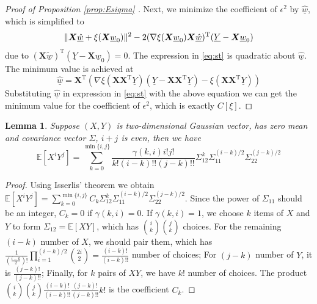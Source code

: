 \documentclass[conference]{IEEEtran}
\newtheorem{lemma}{Lemma}
\DeclarePairedDelimiter\norm{\lVert}{\rVert}
\def\E{\mathbb{E}}
\def\T{\mathrm{T}}
\newcommand{\ide}[2]{ \gamma(#1,#2) }
\begin{document}
\begin{proof}[Proof of Proposition \ref{prop:Esigma} ]
Next, we minimize the coefficient of $\epsilon^2$ by $\underline{\hat{w}}$, which is simplified to 
\begin{equation}\label{eq:st}
\norm{\bm{X}\underline{\hat{w}} + \xi(\bm{X} \underline{w}_0)}^2-
2 (
\nabla \xi(\bm{X} \underline{w}_0)\bm{X}\underline{\hat{w}})^\T(\underline{Y}-\bm{X} \underline{w}_0)
\end{equation}
due to $(\bm{X}\underline{\tilde{w}})^\T (\underline{Y}-\bm{X}\underline{w}_0) = 0 $.
The expression in \eqref{eq:st} is quadratic about $\underline{\hat{w}}$. The minimum value is achieved  at
$$
\underline{\hat{w}} =  \bm{X}^\T(\nabla\xi(\bm{X}\bm{X}^\T \underline{Y})
(\underline{Y}-\bm{X}\bm{X}^\T \underline{Y}) - \xi(\bm{X}\bm{X}^\T \underline{Y}))
$$
Substituting $\underline{\hat{w}}$ in expression in \eqref{eq:st} with the above equation we can get the minimum value for the coefficient of $\epsilon^2$, which is exactly $C[\xi]$.
\end{proof}
\begin{lemma}\label{lemma:Isserlis2}
     Suppose $(X,Y)$ is two-dimensional Gaussian vector,
     has zero mean and covariance vector $\Sigma$, $ i + j $ is even, then we have
\begin{equation*}
    \E[X^i Y^j] =
    \sum_{k=0}^{\min\{i,j\}}
    \frac{\ide{k}{i} i! j!}{k! (i-k)!!(j-k)!!}
    \Sigma_{12}^k \Sigma_{11}^{(i-k)/2}\Sigma_{22}^{(j-k)/2}
\end{equation*}
\end{lemma}
\begin{proof}
Using Isserlis' theorem \cite{isserlis1918formula} we obtain
$  \E[X^i Y^j] = \sum_{k=0}^{\min\{i,j\}} C_k \Sigma_{12}^k \Sigma_{11}^{(i-k)/2}\Sigma_{22}^{(j-k)/2}$. Since the power of $\Sigma_{11}$ should be an integer, $C_k = 0$ if $\ide{k}{i} = 0$. If $\ide{k}{i} = 1$, we choose $k$ items of $X$ and $Y$ to form $\Sigma_{12} = \E[XY]$, which has $\binom{i}{k}\binom{j}{k}$ choices. For the remaining $(i-k)$ number of $X$, we should pair them, which has $\frac{1}{(\frac{i-k}{2})!}\prod_{i=1}^{(i-k)/2} \binom{2i}{2} = \frac{(i-k)!}{(i-k)!!}$ number of choices; For $(j-k)$ number of $Y$, it is $\frac{(j-k)!}{(j-k)!!}$; Finally, for $k$ pairs of $XY$, we have $k!$ number of choices. The product $\binom{i}{k}\binom{j}{k}\frac{(i-k)!}{(i-k)!!}\frac{(j-k)!}{(j-k)!!}k!$ is the coefficient $C_k$.
\end{proof}
\end{document}
